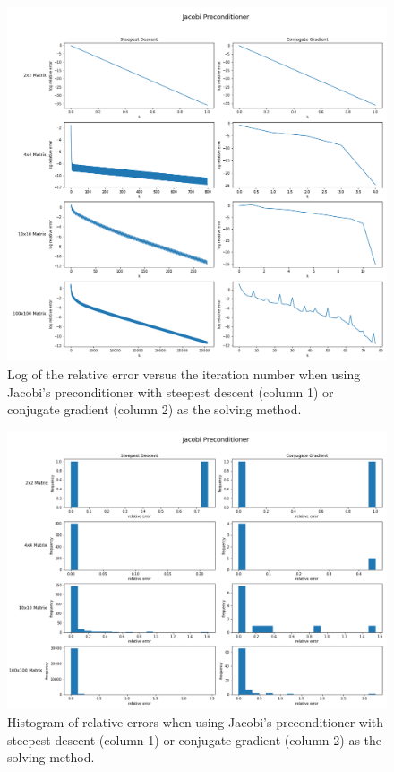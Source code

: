 \documentclass[11pt]{article}
\begin{document}
\begin{figure}[h!]
	\hspace*{-3cm}
	\centering
	\includegraphics[width=1.3\linewidth]{../figures/Log Jacobi Preconditioner}
	\caption{Log of the relative error versus the iteration number when using Jacobi's preconditioner with steepest descent (column 1) or conjugate gradient (column 2) as the solving method.}
	\label{fig:LogJacobi}
\end{figure}

\begin{figure}[h!]
	\hspace*{-3cm}
	\centering
	\includegraphics[width=1.3\linewidth]{../figures/Jacobi Preconditioner Histogram}
	\caption{Histogram of relative errors when using Jacobi's preconditioner with steepest descent (column 1) or conjugate gradient (column 2) as the solving method.}
	\label{fig:HistJacobi}
\end{figure}
\clearpage
\end{document}

